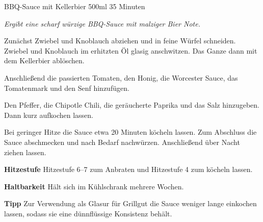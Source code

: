 \begin{recipe}{BBQ-Sauce mit Kellerbier} {500ml} {35 Minuten}

\freeform
\textit{Ergibt eine scharf würzige BBQ-Sauce mit malziger Bier Note.}


Zunächst Zwiebel und Knoblauch abziehen und in feine Würfel schneiden.
Zwiebel und Knoblauch im erhitzten Öl glasig anschwitzen.
Das Ganze dann mit dem Kellerbier ablöschen.


Anschließend die passierten Tomaten, den Honig, die Worcester Sauce, das Tomatenmark und den Senf hinzufügen.


Den Pfeffer, die Chipotle Chili, die geräucherte Paprika und das Salz hinzugeben.
Dann kurz aufkochen lassen.

\newstep
Bei geringer Hitze die Sauce etwa 20 Minuten köcheln lassen.
Zum Abschluss die Sauce abschmecken und nach Bedarf nachwürzen.
Anschließend über Nacht ziehen lassen.

\freeform
\hrulefill

\freeform
\textbf{Hitzestufe}
Hitzestufe 6--7 zum Anbraten und Hitzestufe 4 zum köcheln lassen.

\freeform
\textbf{Haltbarkeit}
Hält sich im Kühlschrank mehrere Wochen.

\freeform
\textbf{Tipp}
Zur Verwendung als Glasur für Grillgut die Sauce weniger lange einkochen lassen, sodass sie eine dünnflüssige Konsistenz behält.

\end{recipe}
